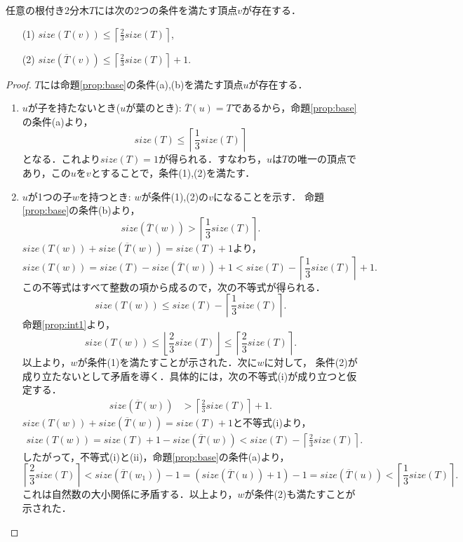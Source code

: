 \begin{lemma}\label{lem:base}
  任意の根付き2分木$T$には次の2つの条件を満たす頂点$v$が存在する．
  \begin{enumerate}
    \item[(1)] $\displaystyle size(T(v))\leq\left\lceil\frac{2}{3}size(T)\right\rceil$,\smallskip
    \item[(2)] $\displaystyle size(\overline{T}(v))\leq\left\lceil\frac{2}{3}size(T)\right\rceil + 1$.
  \end{enumerate}
\end{lemma}

\begin{proof}
  $T$には命題\ref{prop:base}の条件(a),(b)を満たす頂点$u$が存在する．
  \begin{enumerate}
  \item $u$が子を持たないとき($u$が葉のとき): $\overline{T}(u)=T$であるから，命題\ref{prop:base}の条件(a)より，
$$size(T)\leq\left\lceil\frac{1}{3}size(T)\right\rceil$$となる．これより$size(T)=1$が得られる．すなわち，$u$は$T$の唯一の頂点であり，この$u$を$v$とすることで，条件(1),(2)を満たす．

\item $u$が1つの子$w$を持つとき:
$w$が条件(1),(2)の$v$になることを示す．
命題\ref{prop:base}の条件(b)より，
$$size(\overline{T}(w))>\left\lceil\frac{1}{3}size(T)\right\rceil.$$
$size(T(w)) + size(\overline{T}(w)) = size(T) + 1$より，
$$size(T(w)) = size(T) - size(\overline{T}(w)) + 1
< size(T) - \left\lceil\frac{1}{3}size(T)\right\rceil + 1.$$
この不等式はすべて整数の項から成るので，次の不等式が得られる．
$$size(T(w)) \leq size(T) - \left\lceil\frac{1}{3}size(T)\right\rceil.$$
命題\ref{prop:int1}より，
$$size(T(w)) \leq \left\lfloor\frac{2}{3}size(T)\right\rfloor
\leq\left\lceil\frac{2}{3}size(T)\right\rceil.$$
以上より，$w$が条件(1)を満たすことが示された．次に$w$に対して，
条件(2)が成り立たないとして矛盾を導く．具体的には，次の不等式(i)が成り立つと仮定する．
\begin{align*}
size(\overline{T}(w))&>\left\lceil\frac{2}{3}size(T)\right\rceil + 1.\tag{i}
\end{align*}
$size(T(w)) + size(\overline{T}(w)) = size(T) + 1$と不等式(i)より，
\begin{align*}
size(T(w)) = size(T) + 1 - size(\overline{T}(w)) < size(T) - \left\lceil\frac{2}{3}size(T)\right\rceil.\tag{ii}
\end{align*}
したがって，不等式(i)と(ii)，命題\ref{prop:base}の条件(a)より，
$$
\left\lceil\frac{2}{3}size(T)\right\rceil < size(\overline{T}(w_{1})) - 1
  = (size(\overline{T}(u)) + 1) - 1
  = size(\overline{T}(u))
  < \left\lceil\frac{1}{3}size(T)\right\rceil.
$$
これは自然数の大小関係に矛盾する．以上より，$w$が条件(2)も満たすことが示された．


\end{enumerate}
\end{proof}
